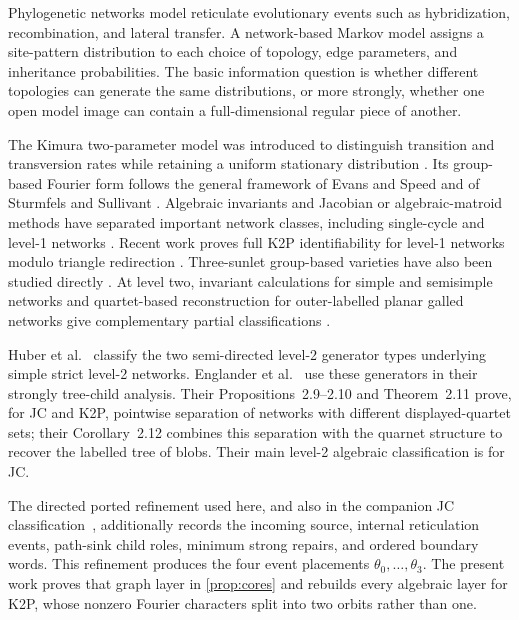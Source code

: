 \documentclass[11pt]{article}
\theoremstyle{remark}
\newcommand{\1}{\mathbf 1}
\begin{document}
Phylogenetic networks model reticulate evolutionary events such as
hybridization, recombination, and lateral transfer.  A network-based Markov
model assigns a site-pattern distribution to each choice of topology, edge
parameters, and inheritance probabilities.  The basic information question
is whether different topologies can generate the same distributions, or more
strongly, whether one open model image can contain a full-dimensional regular
piece of another.

The Kimura two-parameter model was introduced to distinguish transition and
transversion rates while retaining a uniform stationary distribution
\cite{Kimura1980}.  Its group-based Fourier form follows the general
framework of Evans and Speed and of Sturmfels and Sullivant
\cite{EvansSpeed1993,SturmfelsSullivant2005}.  Algebraic invariants and
Jacobian or algebraic-matroid methods have separated important network
classes, including single-cycle and level-1 networks
\cite{GrossLong2018,HolleringSullivant2021,GrossEtAl2021}.  Recent work proves
full K2P identifiability for level-1 networks modulo triangle redirection
\cite[Theorem~4.9]{BritsEtAl2026}.  Three-sunlet group-based varieties have also been
studied directly \cite{CoxGrossMartin2025}.
At level two, invariant calculations for simple and semisimple networks and
quartet-based reconstruction for outer-labelled planar galled networks give
complementary partial classifications
\cite{Ardiyansyah2021,HoltgrefeEtAl2025Quartets}.

Huber et al.~\cite[Lemma~4.2 and Figure~8]{HuberEtAl2025} classify the two
semi-directed level-2 generator types underlying simple strict level-2
networks.  Englander et al.~\cite{EnglanderEtAl2026} use these generators in
their strongly tree-child analysis.  Their Propositions~2.9--2.10 and
Theorem~2.11 prove, for JC and K2P, pointwise separation of networks with
different displayed-quartet sets; their Corollary~2.12 combines this
separation with the quarnet structure to recover the labelled tree of blobs.
Their main level-2 algebraic classification is for JC.

The directed ported refinement used here, and also in the companion JC
classification~\cite{KriebelJC2026}, additionally records the incoming
source, internal reticulation events, path-sink child roles, minimum strong
repairs, and ordered boundary words.  This refinement produces the four event
placements \(\theta_0,\ldots,\theta_3\).  The present work proves that graph
layer in \cref{prop:cores} and rebuilds every algebraic layer for K2P, whose
nonzero Fourier characters split into two orbits rather than one.
\end{document}
